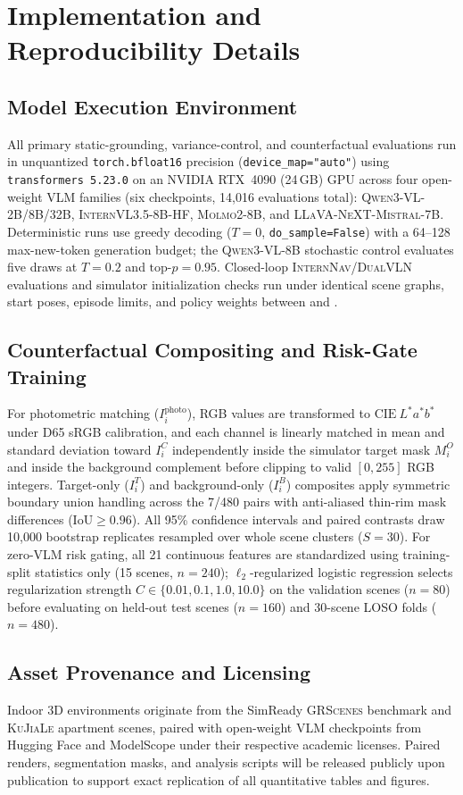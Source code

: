 \section{Implementation and Reproducibility Details}
\label{app:reproduction}

\subsection{Model Execution Environment}
All primary static-grounding, variance-control, and counterfactual evaluations run in unquantized \texttt{torch.bfloat16} precision (\texttt{device\_map="auto"}) using \texttt{transformers 5.23.0} on an NVIDIA RTX~4090 (24\,GB) GPU across four open-weight \textsc{VLM} families (six checkpoints, 14,016 evaluations total): \textsc{Qwen3-VL-2B/8B/32B}, \textsc{InternVL3.5-8B-HF}, \textsc{Molmo2-8B}, and \textsc{LLaVA-NeXT-Mistral-7B}. Deterministic runs use greedy decoding ($T{=}0$, \texttt{do\_sample=False}) with a 64--128 max-new-token generation budget; the \textsc{Qwen3-VL-8B} stochastic control evaluates five draws at $T{=}0.2$ and $\text{top-}p{=}0.95$. Closed-loop \textsc{InternNav/DualVLN} evaluations and simulator initialization checks run under identical scene graphs, start poses, episode limits, and policy weights between \original{} and \converted{}.

\subsection{Counterfactual Compositing and Risk-Gate Training}
For photometric matching ($I_i^{\text{photo}}$), RGB values are transformed to $\mathrm{CIE}~L^*a^*b^*$ under D65 sRGB calibration, and each channel is linearly matched in mean and standard deviation toward $I_i^C$ independently inside the simulator target mask $M_i^O$ and inside the background complement before clipping to valid $[0, 255]$ RGB integers. Target-only ($I_i^T$) and background-only ($I_i^B$) composites apply symmetric boundary union handling across the 7/480 pairs with anti-aliased thin-rim mask differences ($\mathrm{IoU} \ge 0.96$). All 95\% confidence intervals and paired contrasts draw 10,000 bootstrap replicates resampled over whole scene clusters ($S{=}30$). For zero-\textsc{VLM} risk gating, all 21 continuous features are standardized using training-split statistics only (15 scenes, $n{=}240$); $\ell_2$-regularized logistic regression selects regularization strength $C \in \{0.01, 0.1, 1.0, 10.0\}$ on the validation scenes ($n{=}80$) before evaluating on held-out test scenes ($n{=}160$) and 30-scene \textsc{LOSO} folds ($n{=}480$).

\subsection{Asset Provenance and Licensing}
\balance
Indoor 3D environments originate from the SimReady \textsc{GRScenes} benchmark and \textsc{KuJiaLe} apartment scenes, paired with open-weight \textsc{VLM} checkpoints from Hugging Face and ModelScope under their respective academic licenses. Paired renders, segmentation masks, and analysis scripts will be released publicly upon publication to support exact replication of all quantitative tables and figures.
